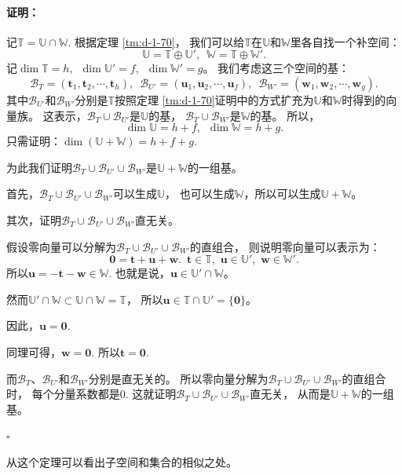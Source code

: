 \documentclass[12pt,UTF8]{ctexbook}
\theoremstyle{definition}
\theoremstyle{plain}
\newtheorem{sk}{思考}[section]
\renewenvironment{proof}{\paragraph{\textbf{证明：}}}{\hfill$\square$}
\begin{document}
\begin{appendix}
\begin{proof}
    记$\mathbb{T} = \mathbb{U} \cap \mathbb{W}$. 根据定理 \ref{tm:d-1-70}，
    我们可以给$\mathbb{T}$在$\mathbb{U}$和$\mathbb{W}$里各自找一个补空间：
    $$ \mathbb{U} = \mathbb{T} \oplus \mathbb{U}', \,\,\, \mathbb{W} = \mathbb{T} \oplus \mathbb{W}'.$$
    记$\dim \mathbb{T} = h, \,\,\, \dim \mathbb{U}' = f, \,\,\, \dim \mathbb{W}' = g$。
    我们考虑这三个空间的基：
    $$ \mathcal{B}_T = (\mathbf{t}_1, \mathbf{t}_2, \cdots, \mathbf{t}_h), \,\,\, \mathcal{B}_{U'} = (\mathbf{u}_1, \mathbf{u}_2, \cdots, \mathbf{u}_f), \,\,\, \mathcal{B}_{W'} = (\mathbf{w}_1, \mathbf{w}_2, \cdots, \mathbf{w}_g). $$  
    其中$\mathcal{B}_{U'}$和$\mathcal{B}_{W'}$分别是$\mathbb{T}$按照定理 
    \ref{tm:d-1-70}证明中的方式扩充为$\mathbb{U}$和$\mathbb{W}$时得到的向量族。
    这表示，$\mathcal{B}_T\cup\mathcal{B}_{U'}$是$\mathbb{U}$的基，
    $\mathcal{B}_T\cup\mathcal{B}_{W'}$是$\mathbb{W}$的基。
    所以，
    $$\dim \mathbb{U} = h + f,\,\,\,\dim \mathbb{W} = h + g.$$
    只需证明：$ \dim (\mathbb{U} + \mathbb{W}) = h + f + g.$

    为此我们证明$\mathcal{B}_T\cup\mathcal{B}_{U'}\cup\mathcal{B}_{W'}$是$\mathbb{U} + \mathbb{W}$的一组基。

    首先，$\mathcal{B}_T\cup\mathcal{B}_{U'}\cup\mathcal{B}_{W'}$可以生成$\mathbb{U}$，
    也可以生成$\mathbb{W}$，所以可以生成$\mathbb{U} + \mathbb{W}$。

    其次，证明$\mathcal{B}_T\cup\mathcal{B}_{U'}\cup\mathcal{B}_{W'}$直无关。

    假设零向量可以分解为$\mathcal{B}_T\cup\mathcal{B}_{U'}\cup\mathcal{B}_{W'}$的直组合，
    则说明零向量可以表示为：
    $$ \mathbf{0} = \mathbf{t} + \mathbf{u} + \mathbf{w}. \,\,\,\mathbf{t}\in\mathbb{T},\,\,\mathbf{u}\in\mathbb{U}',\,\,\mathbf{w}\in\mathbb{W}'.$$
    所以$\mathbf{u} = -\mathbf{t} - \mathbf{w} \in \mathbb{W}$.
    也就是说，$\mathbf{u}\in \mathbb{U}'\cap\mathbb{W}$。

    然而$\mathbb{U}'\cap\mathbb{W} \subset \mathbb{U}\cap\mathbb{W} = \mathbb{T}$，
    所以$\mathbf{u}\in\mathbb{T}\cap\mathbb{U}' = \{\mathbf{0}\}$。

    因此，$\mathbf{u} = \mathbf{0}.$

    同理可得，$\mathbf{w} = \mathbf{0}.$ 所以$\mathbf{t} = \mathbf{0}.$

    而$\mathcal{B}_T$、$\mathcal{B}_{U'}$和$\mathcal{B}_{W'}$分别是直无关的。
    所以零向量分解为$\mathcal{B}_T\cup\mathcal{B}_{U'}\cup\mathcal{B}_{W'}$的直组合时，
    每个分量系数都是0. 
    这就证明$\mathcal{B}_T\cup\mathcal{B}_{U'}\cup\mathcal{B}_{W'}$直无关，
    从而是$\mathbb{U} + \mathbb{W}$的一组基。

\end{proof}

从这个定理可以看出子空间和集合的相似之处。


\end{appendix}
\end{document}
